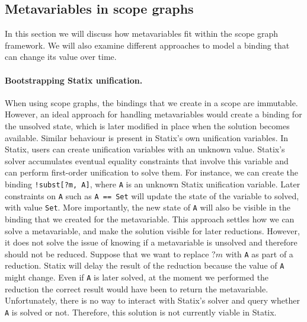 \subsection{Metavariables in scope graphs}\label{sec:metas-in-scope-graphs}
In this section we will discuss how metavariables fit within the scope graph framework. We will also examine different approaches to model a binding that can change its value over time. 
\paragraph{Bootstrapping Statix unification.} When using scope graphs, the bindings that we create in a scope are immutable. However, an ideal approach for handling metavariables would create a binding for the unsolved state, which is later modified in place when the solution becomes available. Similar behaviour is present in Statix's own unification variables. In Statix, users can create unification variables with an unknown value. Statix's solver accumulates eventual equality constraints that involve this variable and can perform first-order unification to solve them. For instance, we can create the binding \texttt{!subst[?m, A]}, where \texttt{A} is an unknown Statix unification variable. Later constraints on \texttt{A} such as \texttt{A == Set} will update the state of the variable to solved, with value \texttt{Set}.
More importantly, the new state of \texttt{A} will also be visible in the binding that we created for the metavariable. 
This approach settles how we can solve a metavariable, and make the solution visible for later reductions. However, it does not solve the issue of knowing if a metavariable is unsolved and therefore should not be reduced. Suppose that we want to replace $?m$ with \texttt{A} as part of a reduction. Statix will delay the result of the reduction because the value of \texttt{A} might change. Even if \texttt{A} is later solved, at the moment we performed the reduction the correct result would have been to return the metavariable. Unfortunately, there is no way to interact with Statix's solver and query whether \texttt{A} is solved or not. Therefore, this solution is not currently viable in Statix.

